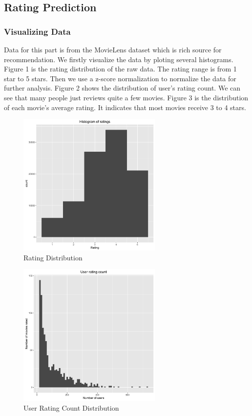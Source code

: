 \documentclass[conference]{IEEEtran}
\begin{document}
\subsection{Rating Prediction}
\subsubsection{Visualizing Data}
Data for this part is from the MovieLens dataset which is rich source for recommendation. We firstly visualize the data by ploting several histograms. Figure 1 is the rating distribution of the raw data. The rating range is from 1 star to 5 stars. Then we use a z-score normalization to normalize the data for further analysis. Figure 2 shows the distribution of user's rating count. We can see that many people just reviews quite a few movies. Figure 3 is the distribution of each movie's average rating. It indicates that most movies receive 3 to 4 stars.
\begin{figure}
	\centering
	\includegraphics[width=2.8in]{rating.png}
	\caption{Rating Distribution}
	\label{fig:side:a}
\end{figure}

\begin{figure}
	\centering
	\includegraphics[width=2.8in]{user_rating.png}
	\caption{User Rating Count Distribution}
	\label{fig:side:a}
\end{figure}
\end{document}

